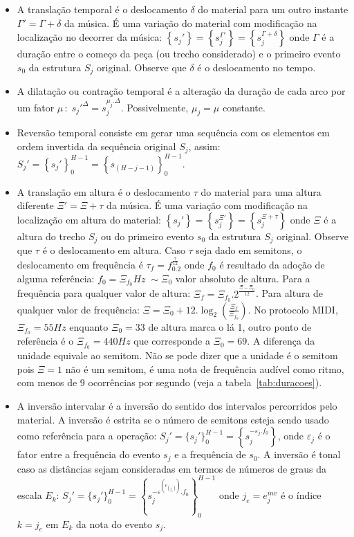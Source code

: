 \begin{itemize}
    \item A translação temporal é o deslocamento $\delta$ do material para um outro instante $\Gamma'=\Gamma + \delta$ da música. É uma variação do material com modificação na localização no decorrer da música: $\left\{s_j'\right\}=\left\{s_j^{\Gamma'}\right\}=\left\{s_j^{\Gamma+\delta}\right\}$ onde $\Gamma$ é a duração entre o começo da peça (ou trecho considerado) e o primeiro evento $s_0$ da estrutura $S_j$ original. Observe que $\delta$ é o deslocamento no tempo.
    \item A dilatação ou contração temporal é a alteração da duração de cada arco por um fator $\mu\,:\; s_j'^{\Delta}=s_j^{\mu_j . \Delta}$. Possivelmente, $\mu_j=\mu$ constante.
    \item Reversão temporal consiste em gerar uma sequência com os elementos em ordem invertida da sequência original $S_j$, assim: $S_j'=\left\{s_j'\right\}_0^{H-1}=\left\{s_{(H-j-1)}\right\}_0^{H-1}$.
    \item A translação em altura é o deslocamento $\tau$ do material para uma altura diferente $\Xi'=\Xi + \tau$ da música. É uma variação com modificação na localização em altura do material: $\left\{s_j'\right\}=\left\{s_j^{\Xi'}\right\}=\left\{s_j^{\Xi+\tau}\right\}$ onde $\Xi$ é a altura do trecho $S_j$ ou do primeiro evento $s_0$ da estrutura $S_j$ original. Observe que $\tau$ é o deslocamento em altura. Caso $\tau$ seja dado em semitons, o deslocamento em frequência é $\tau_f=f_0.2^{\frac{\tau}{12}}$ onde $f_0$ é resultado da adoção de alguma referência: $f_0=\Xi_{f_0}Hz\;\sim \Xi_0$ valor absoluto de altura. Para a frequência para qualquer valor de altura: $\Xi_f=\Xi_{f_0}.2^{\frac{\Xi-\Xi_0}{12}}$. 
        Para altura de qualquer valor de frequência: $\Xi=\Xi_0 +12 . \log_2\left(\frac{\Xi_f}{\Xi_{f_0}}\right)$.  No protocolo MIDI, $\Xi_{f_0}=55Hz$ enquanto $\Xi_0=33$ de altura marca o lá 1, outro ponto de referência é o $\Xi_{f_0}=440Hz$ que corresponde a $\Xi_0=69$. A diferença da unidade equivale ao semitom. Não se pode dizer que a unidade é o semitom pois $\Xi=1$ não é um semitom, é uma nota de frequência audível como ritmo, com menos de 9 ocorrências por segundo (veja a tabela~\ref{tab:duracoes}).
    \item A inversão intervalar é a inversão do sentido dos intervalos percorridos pelo material. A inversão é estrita se o número de semitons esteja sendo usado como referência para a operação: $S_j'=\{s_j'\}_0^{H-1}=\left\{s_j^{-\varepsilon_j . f_0}\right\}$, onde $\varepsilon_j$ é o fator entre a frequência do evento $s_j$ e a frequência de $s_0$. A inversão é tonal caso as distâncias sejam consideradas em termos de números de graus da escala $E_k$: $S_j'=\{s_j'\}_0^{H-1}=\left\{s_j^{-\varepsilon^{\left(e_{\left(j_e\right)}\right)} . f_0}\right\}_0^{H-1}$ onde $j_e=e_{j}^{inv}$ é o índice $k=j_e$ em $E_k$ da nota do evento $s_j$.

\end{itemize}
